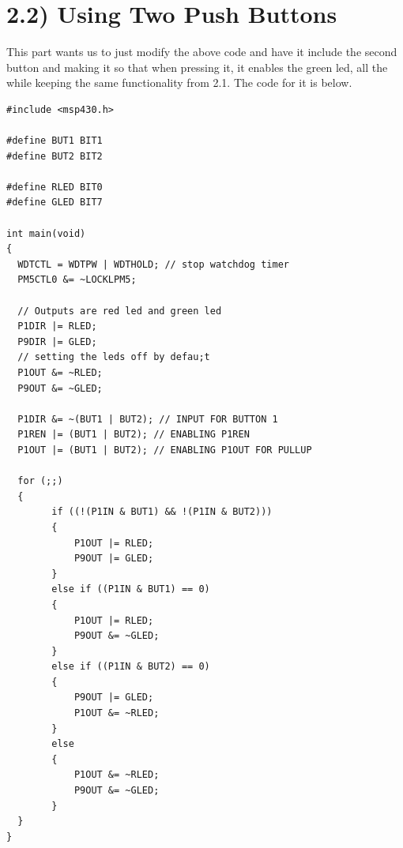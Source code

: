 \documentclass{article}
\begin{document}
\section{2.2) Using Two Push Buttons}
This part wants us to just modify the above code and have it include the second button and making it so that when pressing it, it enables the green led, all the while keeping the same functionality from 2.1. The code for it is below.
\begin{lstlisting}
#include <msp430.h>

#define BUT1 BIT1
#define BUT2 BIT2

#define RLED BIT0
#define GLED BIT7

int main(void)
{
  WDTCTL = WDTPW | WDTHOLD; // stop watchdog timer
  PM5CTL0 &= ~LOCKLPM5;

  // Outputs are red led and green led
  P1DIR |= RLED;
  P9DIR |= GLED;
  // setting the leds off by defau;t
  P1OUT &= ~RLED;
  P9OUT &= ~GLED;

  P1DIR &= ~(BUT1 | BUT2); // INPUT FOR BUTTON 1
  P1REN |= (BUT1 | BUT2); // ENABLING P1REN
  P1OUT |= (BUT1 | BUT2); // ENABLING P1OUT FOR PULLUP

  for (;;)
  {
		if ((!(P1IN & BUT1) && !(P1IN & BUT2)))
		{
			P1OUT |= RLED;
			P9OUT |= GLED;
		}
		else if ((P1IN & BUT1) == 0)
		{
			P1OUT |= RLED;
			P9OUT &= ~GLED;
		}
		else if ((P1IN & BUT2) == 0)
		{
			P9OUT |= GLED;
			P1OUT &= ~RLED;
		}
		else
		{
			P1OUT &= ~RLED;
			P9OUT &= ~GLED;
		}
  }
}
\end{lstlisting}
\end{document}
